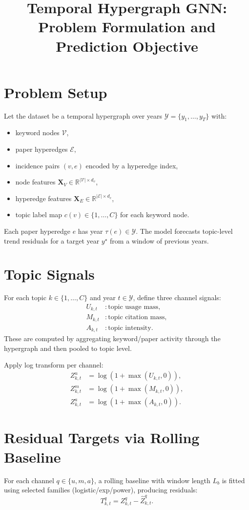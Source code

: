 \documentclass[11pt]{article}
\title{Temporal Hypergraph GNN: Problem Formulation and Prediction Objective}
\author{}
\date{}
\begin{document}
\maketitle

\section{Problem Setup}
Let the dataset be a temporal hypergraph over years $\mathcal{Y}=\{y_1,\dots,y_T\}$ with:
\begin{itemize}[leftmargin=1.5em]
  \item keyword nodes $\mathcal{V}$,
  \item paper hyperedges $\mathcal{E}$,
  \item incidence pairs $(v,e)$ encoded by a hyperedge index,
  \item node features $\mathbf{X}_V \in \mathbb{R}^{|\mathcal{V}|\times d_v}$,
  \item hyperedge features $\mathbf{X}_E \in \mathbb{R}^{|\mathcal{E}|\times d_e}$,
  \item topic label map $c(v)\in\{1,\dots,C\}$ for each keyword node.
\end{itemize}

Each paper hyperedge $e$ has year $\tau(e)\in\mathcal{Y}$. The model forecasts topic-level trend residuals for a target year $y^\star$ from a window of previous years.

\section{Topic Signals}
For each topic $k\in\{1,\dots,C\}$ and year $t\in\mathcal{Y}$, define three channel signals:
\begin{align}
U_{k,t} &: \text{topic usage mass},\\
M_{k,t} &: \text{topic citation mass},\\
A_{k,t} &: \text{topic intensity}.
\end{align}
These are computed by aggregating keyword/paper activity through the hypergraph and then pooled to topic level.

Apply log transform per channel:
\begin{align}
Z^u_{k,t} &= \log(1+\max(U_{k,t},0)),\\
Z^m_{k,t} &= \log(1+\max(M_{k,t},0)),\\
Z^a_{k,t} &= \log(1+\max(A_{k,t},0)).
\end{align}

\section{Residual Targets via Rolling Baseline}
For each channel $q\in\{u,m,a\}$, a rolling baseline with window length $L_b$ is fitted using selected families (logistic/exp/power), producing residuals:
\begin{equation}
T^q_{k,t} = Z^q_{k,t} - \widehat{Z}^q_{k,t}.
\end{equation}
\end{document}
